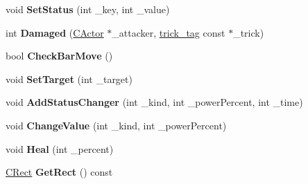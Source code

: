 \begin{DoxyCompactItemize}
\item 
void {\bfseries Set\+Status} (int \+\_\+key, int \+\_\+value)\hypertarget{class_c_actor_a7540692fbc4f3f3ecde0070566cb9ac8}{}\label{class_c_actor_a7540692fbc4f3f3ecde0070566cb9ac8}

\item 
int {\bfseries Damaged} (\hyperlink{class_c_actor}{C\+Actor} $\ast$\+\_\+attacker, \hyperlink{structtrick__tag}{trick\+\_\+tag} const $\ast$\+\_\+trick)\hypertarget{class_c_actor_affe0a553bc8b698bafbad9d4dc1b15cf}{}\label{class_c_actor_affe0a553bc8b698bafbad9d4dc1b15cf}

\item 
bool {\bfseries Check\+Bar\+Move} ()\hypertarget{class_c_actor_aacdd243e8678573bf6f1edca3b2abe09}{}\label{class_c_actor_aacdd243e8678573bf6f1edca3b2abe09}

\item 
void {\bfseries Set\+Target} (int \+\_\+target)\hypertarget{class_c_actor_a7ec02bed0a0f03d2648e48cb1197c1d2}{}\label{class_c_actor_a7ec02bed0a0f03d2648e48cb1197c1d2}

\item 
void {\bfseries Add\+Status\+Changer} (int \+\_\+kind, int \+\_\+power\+Percent, int \+\_\+time)\hypertarget{class_c_actor_a1d71b5ab2aad32d2caf6a651c5158339}{}\label{class_c_actor_a1d71b5ab2aad32d2caf6a651c5158339}

\item 
void {\bfseries Change\+Value} (int \+\_\+kind, int \+\_\+power\+Percent)\hypertarget{class_c_actor_a344f8eeb57ddf973bb95d647e0b742c9}{}\label{class_c_actor_a344f8eeb57ddf973bb95d647e0b742c9}

\item 
void {\bfseries Heal} (int \+\_\+percent)\hypertarget{class_c_actor_a85158d40366687dc3d2f4a11f42ddd90}{}\label{class_c_actor_a85158d40366687dc3d2f4a11f42ddd90}

\item 
\hyperlink{class_c_rect}{C\+Rect} {\bfseries Get\+Rect} () const \hypertarget{class_c_actor_ab74185243a96730c9992682bb4f1beb3}{}\label{class_c_actor_ab74185243a96730c9992682bb4f1beb3}

\end{DoxyCompactItemize}
